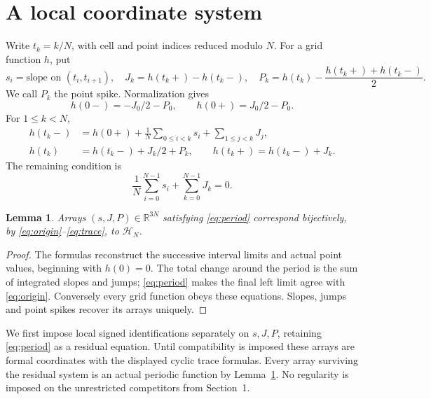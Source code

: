 \documentclass[11pt]{article}
\newtheorem{lemma}[theorem]{Lemma}
\newcommand{\R}{\mathbb R}\newcommand{\Q}{\mathbb Q}\newcommand{\Z}{\mathbb Z}
\begin{document}
\section{A local coordinate system}
Write $t_k=k/N$, with cell and point indices reduced modulo $N$. For a grid function $h$, put
\[
 s_i=\text{slope on }(t_i,t_{i+1}),\quad
 J_k=h(t_k+)-h(t_k-),\quad
 P_k=h(t_k)-\frac{h(t_k+)+h(t_k-)}2.
\]
We call $P_k$ the point spike. Normalization gives
\begin{equation}\label{eq:origin}
 h(0-)=-J_0/2-P_0,\qquad h(0+)=J_0/2-P_0.
\end{equation}
For $1\leq k<N$,
\begin{align}
 h(t_k-)&=h(0+)+\frac1N\sum_{0\leq i<k}s_i+\sum_{1\leq j<k}J_j,\label{eq:trace}\\
 h(t_k)&=h(t_k-)+J_k/2+P_k,\qquad
 h(t_k+)=h(t_k-)+J_k.\nonumber
\end{align}
The remaining condition is
\begin{equation}\label{eq:period}
 \frac1N\sum_{i=0}^{N-1}s_i+\sum_{k=0}^{N-1}J_k=0.
\end{equation}

\begin{lemma}\label{lem:coords}
Arrays $(s,J,P)\in\R^{3N}$ satisfying \eqref{eq:period} correspond bijectively, by \eqref{eq:origin}--\eqref{eq:trace}, to $\mathcal H_N$.
\end{lemma}
\begin{proof}
The formulas reconstruct the successive interval limits and actual point values, beginning with $h(0)=0$. The total change around the period is the sum of integrated slopes and jumps; \eqref{eq:period} makes the final left limit agree with \eqref{eq:origin}. Conversely every grid function obeys these equations. Slopes, jumps and point spikes recover its arrays uniquely.
\end{proof}

We first impose local signed identifications separately on $s,J,P$, retaining \eqref{eq:period} as a residual equation. Until compatibility is imposed these arrays are formal coordinates with the displayed cyclic trace formulas. Every array surviving the residual system is an actual periodic function by Lemma~\ref{lem:coords}. No regularity is imposed on the unrestricted competitors from Section~1.
\end{document}
